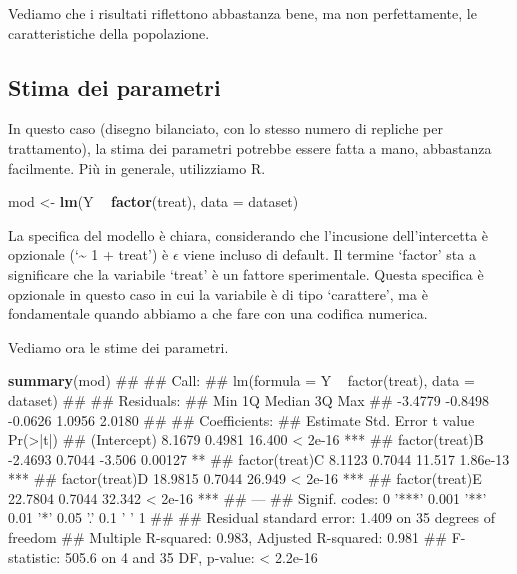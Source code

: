 \documentclass[a4paper,12pt,oneside]{book}
\newenvironment{Shaded}{\begin{snugshade}}{\end{snugshade}}
\newcommand{\KeywordTok}[1]{\textcolor[rgb]{0.13,0.29,0.53}{\textbf{#1}}}
\newcommand{\DataTypeTok}[1]{\textcolor[rgb]{0.13,0.29,0.53}{#1}}
\newcommand{\StringTok}[1]{\textcolor[rgb]{0.31,0.60,0.02}{#1}}
\newcommand{\OperatorTok}[1]{\textcolor[rgb]{0.81,0.36,0.00}{\textbf{#1}}}
\newcommand{\NormalTok}[1]{#1}
\theoremstyle{definition}
\theoremstyle{definition}
\theoremstyle{definition}
\theoremstyle{remark}
\begin{document}
Vediamo che i risultati riflettono abbastanza bene, ma non
perfettamente, le caratteristiche della popolazione.

\subsection{Stima dei parametri}\label{stima-dei-parametri}

In questo caso (disegno bilanciato, con lo stesso numero di repliche per
trattamento), la stima dei parametri potrebbe essere fatta a mano,
abbastanza facilmente. Più in generale, utilizziamo R.

\begin{Shaded}
\begin{Highlighting}[]
\NormalTok{mod <-}\StringTok{ }\KeywordTok{lm}\NormalTok{(Y }\OperatorTok{~}\StringTok{ }\KeywordTok{factor}\NormalTok{(treat), }\DataTypeTok{data =}\NormalTok{ dataset)}
\end{Highlighting}
\end{Shaded}

La specifica del modello è chiara, considerando che l'incusione
dell'intercetta è opzionale (`\textasciitilde{} 1 + treat') è
\(\epsilon\) viene incluso di default. Il termine `factor' sta a
significare che la variabile `treat' è un fattore sperimentale. Questa
specifica è opzionale in questo caso in cui la variabile è di tipo
`carattere', ma è fondamentale quando abbiamo a che fare con una
codifica numerica.

Vediamo ora le stime dei parametri.

\begin{Shaded}
\begin{Highlighting}[]
\KeywordTok{summary}\NormalTok{(mod)}
\NormalTok{## }
\NormalTok{## Call:}
\NormalTok{## lm(formula = Y ~ factor(treat), data = dataset)}
\NormalTok{## }
\NormalTok{## Residuals:}
\NormalTok{##     Min      1Q  Median      3Q     Max }
\NormalTok{## -3.4779 -0.8498 -0.0626  1.0956  2.0180 }
\NormalTok{## }
\NormalTok{## Coefficients:}
\NormalTok{##                Estimate Std. Error t value Pr(>|t|)    }
\NormalTok{## (Intercept)      8.1679     0.4981  16.400  < 2e-16 ***}
\NormalTok{## factor(treat)B  -2.4693     0.7044  -3.506  0.00127 ** }
\NormalTok{## factor(treat)C   8.1123     0.7044  11.517 1.86e-13 ***}
\NormalTok{## factor(treat)D  18.9815     0.7044  26.949  < 2e-16 ***}
\NormalTok{## factor(treat)E  22.7804     0.7044  32.342  < 2e-16 ***}
\NormalTok{## ---}
\NormalTok{## Signif. codes:  0 '***' 0.001 '**' 0.01 '*' 0.05 '.' 0.1 ' ' 1}
\NormalTok{## }
\NormalTok{## Residual standard error: 1.409 on 35 degrees of freedom}
\NormalTok{## Multiple R-squared:  0.983,  Adjusted R-squared:  0.981 }
\NormalTok{## F-statistic: 505.6 on 4 and 35 DF,  p-value: < 2.2e-16}
\end{Highlighting}
\end{Shaded}
\end{document}
